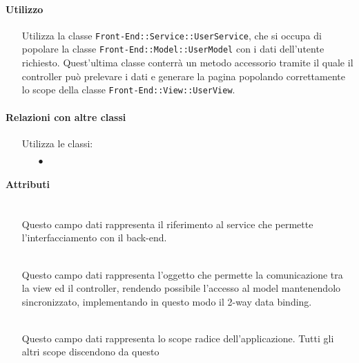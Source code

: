\paragraph*{Utilizzo}
\begin{itemize}
\item[] Utilizza la classe \texttt{Front-End::Service::UserService}, che si occupa di popolare la classe \texttt{Front-End::Model::UserModel} con i dati dell'utente richiesto. Quest'ultima classe conterrà un metodo accessorio tramite il quale il controller può prelevare i dati e generare la pagina popolando correttamente lo scope della classe \texttt{Front-End::View::UserView}.
\end{itemize}

\paragraph*{Relazioni con altre classi}
\begin{itemize}


\item[] Utilizza le classi:
\begin{itemize}
\item[$\bullet$] 
\end{itemize}
\end{itemize}

\paragraph*{Attributi}
\begin{itemize}
\item[]  \\ Questo campo dati rappresenta il riferimento al service che permette l'interfacciamento con il back-end.
\item[]  \\ Questo campo dati rappresenta l'oggetto che permette la comunicazione tra la view ed il controller, rendendo possibile l’accesso al model mantenendolo sincronizzato, implementando in questo modo il 2-way data binding.
\item[]  \\ Questo campo dati rappresenta lo scope radice dell'applicazione. Tutti gli altri scope discendono da questo
\end{itemize}

